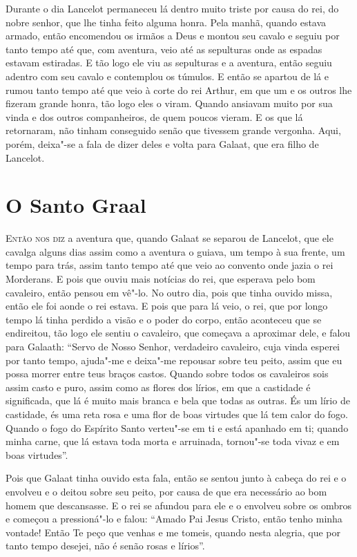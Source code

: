  Durante o dia Lancelot permaneceu lá dentro muito triste por causa do rei, do
nobre senhor, que lhe tinha feito alguma honra. Pela manhã, quando
estava armado, então encomendou os irmãos a Deus e montou seu cavalo e seguiu
por tanto tempo até que, com aventura, veio até as sepulturas onde as espadas
estavam estiradas. E tão logo ele viu as sepulturas e a aventura, então seguiu adentro
com seu cavalo e contemplou os túmulos. E então se apartou de lá e rumou tanto
tempo até que veio à corte do rei Arthur, em que um e os outros lhe fizeram
grande honra, tão logo eles o viram. Quando ansiavam muito por sua vinda e dos
outros companheiros, de quem poucos vieram. E os que lá retornaram, não tinham
conseguido senão que tivessem grande vergonha. Aqui, porém, deixa"-se a
fala de dizer deles e volta para Galaat, que era filho de Lancelot. 

\chapter{O Santo Graal}

\textsc{Então nos diz} a aventura que, quando Galaat se separou de Lancelot, que ele
cavalga alguns dias assim como a aventura o guiava, um tempo à sua frente, um
tempo para trás, assim tanto tempo até que veio ao convento onde jazia o rei
Morderans. E pois que ouviu mais notícias do rei, que esperava pelo bom
cavaleiro, então pensou em vê"-lo. No outro dia, pois que tinha ouvido missa,
então ele foi aonde o rei estava. E pois que para lá veio, o rei, que por longo
tempo lá tinha perdido a visão e o poder do corpo, então aconteceu que se
endireitou, tão logo ele sentiu o cavaleiro, que começava a aproximar dele, e
falou para Galaath: “Servo de Nosso Senhor, verdadeiro cavaleiro, cuja vinda
esperei por tanto tempo, ajuda"-me e deixa"-me repousar sobre teu peito, assim
que eu possa morrer entre teus braços castos. Quando sobre todos os cavaleiros
sois assim casto e puro, assim como as flores dos lírios, em que a castidade é
significada, que lá é muito mais branca e bela que todas as outras. És um lírio
de castidade, és uma reta rosa e uma flor de boas virtudes que lá tem calor do
fogo. Quando o fogo do Espírito Santo verteu"-se em ti e está apanhado em ti;
quando minha carne, que lá estava toda morta e arruinada, tornou"-se toda vivaz
e em boas virtudes”.

Pois que Galaat tinha ouvido esta fala, então se sentou junto à cabeça do rei e
o envolveu e o deitou sobre seu peito, por causa de que era necessário ao bom
homem que descansasse. E o rei se afundou para ele e o envolveu sobre os ombros
e começou a pressioná"-lo e falou: “Amado Pai Jesus Cristo, então tenho minha
vontade! Então Te peço que venhas e me tomeis, quando nesta alegria, que por
tanto tempo desejei, não é senão rosas e lírios”. 

